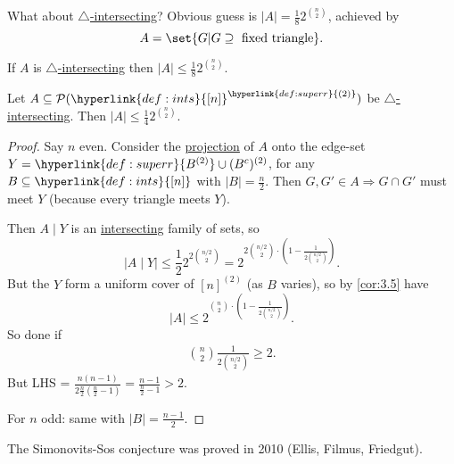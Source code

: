 \documentclass{article}
\let\subset\subseteq
\begin{document}
What about \hyperlink{def:hinter}{$\triangle$-intersecting}? Obvious guess is $|A| = \frac{1}{8} 2^{\binom n 2}$, achieved by
\begin{equation*}A = \set{G | G \supseteq \text{ fixed triangle}}.\end{equation*}
\begin{conjecture}
  If $A$ is \hyperlink{def:hinter}{$\triangle$-intersecting} then $|A| \leq \frac{1}{8} 2^{\binom{n}{2}}.$
\end{conjecture}
\begin{nthm}\label{thm:3.8}
  Let $A \subset \mathcal{P}(\hyperlink{def:ints}{[n]}^{\hyperlink{def:superr}{(2)}})$ be \hyperlink{def:hinter}{$\triangle$-intersecting}.
  Then $|A| \leq \frac{1}{4} 2^{\binom n 2}$.
\end{nthm}
\begin{proof}
  Say $n$ even.
  Consider the \hyperlink{def:proj}{projection} of $A$ onto the edge-set $Y = \hyperlink{def:superr}{B^{(2)}} \cup (B^c)^{(2)}$, for any $B \subset \hyperlink{def:ints}{[n]}$ with $|B| = \frac{n}{2}$.
  Then $G, G' \in A \Rightarrow G \cap G'$ must meet $Y$ (because every triangle meets $Y$).
  \begin{center}
  \end{center}
  Then \hyperlink{def:proj}{$A \mid Y$} is an \hyperlink{def:inter}{intersecting} family of sets, so
  \begin{equation*}
    |A \mid Y| \leq \frac{1}{2} 2^{2 \binom{n/2}{2}} = 2^{2 \binom{n/2}{2} \cdot \left(1 - \frac{1}{2 \binom{n/2}{2}}\right)}.
  \end{equation*}
  But the $Y$ form a uniform cover of $[n]^{(2)}$ (as $B$ varies), so by \cref{cor:3.5} have
  \begin{equation*}
    |A| \leq 2^{\binom{n}{2} \cdot \left(1 - \frac{1}{2 \binom{n/2}{2}}\right)}.
  \end{equation*}
  So done if
  \begin{align*}
    \binom{n}{2} \frac{1}{2 \binom{n/2}{2}} \geq 2.
  \end{align*}
  But LHS = $\frac{n(n-1)}{2 \frac{n}{2} (\frac{n}{2}-1)} = \frac{n-1}{\frac{n}{2}-1} > 2$.

  For $n$ odd: same with $|B| = \frac{n-1}{2}$.
\end{proof}
The Simonovits-Sos conjecture was proved in 2010 (Ellis, Filmus, Friedgut).
\end{document}
